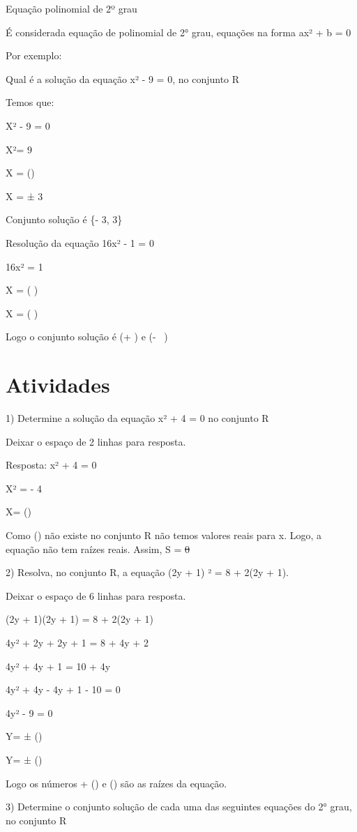 Equação polinomial de 2º grau

É considerada equação de polinomial de 2° grau, equações na forma ax² +
b = 0

Por exemplo:

Qual é a solução da equação x² - 9 = 0, no conjunto R

Temos que:

X² - 9 = 0

X²= 9

X = ()

X = ± 3

Conjunto solução é \{- 3, 3\}

Resolução da equação 16x² - 1 = 0

16x² = 1

X = ( \pm {})

X = ( \pm {})

Logo o conjunto solução é (+ ) e (- \ )

\section{Atividades}

1) Determine a solução da equação x² + 4 = 0 no conjunto R

Deixar o espaço de 2 linhas para resposta.

Resposta: x² + 4 = 0

X² = - 4

X= ()

Como () não existe no conjunto R não temos valores reais
para x. Logo, a equação não tem raízes reais. Assim, S = \sout{0}

2) Resolva, no conjunto R, a equação (2y + 1) ² = 8 + 2(2y + 1).

Deixar o espaço de 6 linhas para resposta.

(2y + 1)(2y + 1) = 8 + 2(2y + 1)

4y² + 2y + 2y + 1 = 8 + 4y + 2

4y² + 4y + 1 = 10 + 4y

4y² + 4y - 4y + 1 - 10 = 0

4y² - 9 = 0

Y= ± ()

Y= ± ()

Logo os números + () e () são as raízes da
equação.

3) Determine o conjunto solução de cada uma das seguintes equações do 2°
grau, no conjunto R

